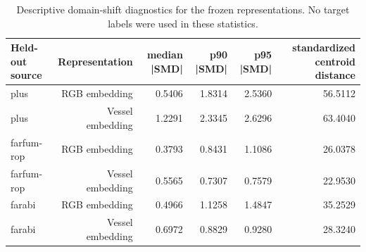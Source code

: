 \begin{table}[htbp]
\centering
\small
\caption{Descriptive domain-shift diagnostics for the frozen representations. No target labels were used in these statistics.}
\label{tab:domainshift}
\begin{tabular}{lrrrrr}
\toprule
Held-out source & Representation & median |SMD| & p90 |SMD| & p95 |SMD| & standardized centroid distance \\
\midrule
plus & RGB embedding & 0.5406 & 1.8314 & 2.5360 & 56.5112 \\
plus & Vessel embedding & 1.2291 & 2.3345 & 2.6296 & 63.4040 \\
farfum-rop & RGB embedding & 0.3793 & 0.8431 & 1.1086 & 26.0378 \\
farfum-rop & Vessel embedding & 0.5565 & 0.7307 & 0.7579 & 22.9530 \\
farabi & RGB embedding & 0.4966 & 1.1258 & 1.4847 & 35.2529 \\
farabi & Vessel embedding & 0.6972 & 0.8829 & 0.9280 & 28.3240 \\
\bottomrule
\end{tabular}
\end{table}
